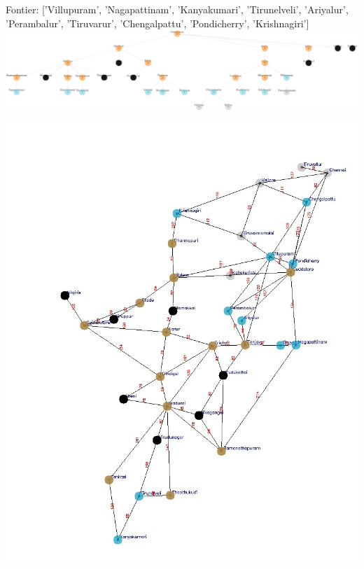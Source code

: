 \documentclass[xcolor=table]{beamer}
\begin{document}
\begin{frame}
  { \tiny Fontier: ['Villupuram', 'Nagapattinam', 'Kanyakumari', 'Tirunelveli', 'Ariyalur', 'Perambalur', 'Tiruvarur', 'Chengalpattu', 'Pondicherry', 'Krishnagiri']}
  \includegraphics[width=1\textwidth]{../BFSNodes/29-1.png}
  \begin{center}
    \includegraphics[height=0.55\textheight]{../BFSoutput/tamilBFS27.jpg}
  \end{center}
\end{frame}
\end{document}
